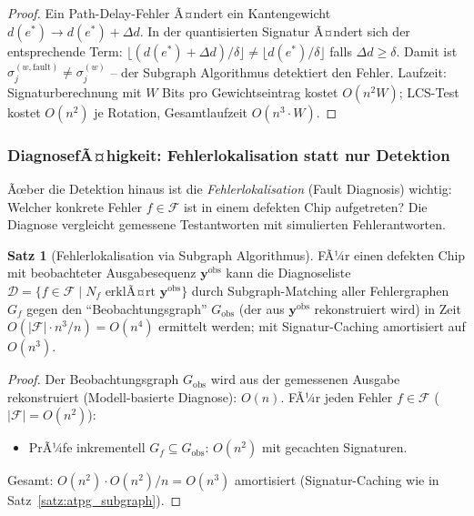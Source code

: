 ﻿\documentclass[a4paper,12pt]{article}
\theoremstyle{definition}
\newtheorem{satz}{Satz}
\begin{document}
\begin{proof}
  Ein Path-Delay-Fehler Ã¤ndert ein Kantengewicht $d(e^*) \to d(e^*) + \Delta d$.
  In der quantisierten Signatur Ã¤ndert sich der entsprechende Term:
  $\lfloor (d(e^*) + \Delta d)/\delta \rfloor \neq \lfloor d(e^*)/\delta \rfloor$
  falls $\Delta d \geq \delta$.
  Damit ist $\sigma_j^{(w, \text{fault})} \neq \sigma_j^{(w)}$ -- der Subgraph
  Algorithmus detektiert den Fehler. Laufzeit: Signaturberechnung mit $W$ Bits
  pro Gewichtseintrag kostet $O(n^2 W)$; LCS-Test kostet $O(n^2)$ je Rotation,
  Gesamtlaufzeit $O(n^3 \cdot W)$.
\end{proof}

\subsubsection{DiagnosefÃ¤higkeit: Fehlerlokalisation statt nur Detektion}

Ãœber die Detektion hinaus ist die \emph{Fehlerlokalisation} (Fault Diagnosis) wichtig:
Welcher konkrete Fehler $f \in \mathcal{F}$ ist in einem defekten Chip aufgetreten?
Die Diagnose vergleicht gemessene Testantworten mit simulierten Fehlerantworten.

\begin{satz}[Fehlerlokalisation via Subgraph Algorithmus]\label{satz:fehlerlokal}
  FÃ¼r einen defekten Chip mit beobachteter Ausgabesequenz $\mathbf{y}^{\text{obs}}$
  kann die Diagnoseliste $\mathcal{D} = \{f \in \mathcal{F} \mid N_f \text{ erklÃ¤rt }
  \mathbf{y}^{\text{obs}}\}$ durch Subgraph-Matching aller Fehlergraphen $G_f$ gegen
  den ``Beobachtungsgraph'' $G_{\text{obs}}$ (der aus $\mathbf{y}^{\text{obs}}$ rekonstruiert
  wird) in Zeit $O(|\mathcal{F}| \cdot n^3 / n) = O(n^4)$ ermittelt werden; mit
  Signatur-Caching amortisiert auf $O(n^3)$.
\end{satz}

\begin{proof}
  Der Beobachtungsgraph $G_{\text{obs}}$ wird aus der gemessenen Ausgabe rekonstruiert
  (Modell-basierte Diagnose): $O(n)$. FÃ¼r jeden Fehler $f \in \mathcal{F}$ ($|\mathcal{F}|
  = O(n^2)$):
  \begin{itemize}
    \item PrÃ¼fe inkrementell $G_f \subseteq G_{\text{obs}}$: $O(n^2)$ mit gecachten Signaturen.
  \end{itemize}
  Gesamt: $O(n^2) \cdot O(n^2) / n = O(n^3)$ amortisiert (Signatur-Caching wie in
  Satz~\ref{satz:atpg_subgraph}).
\end{proof}
\end{document}
